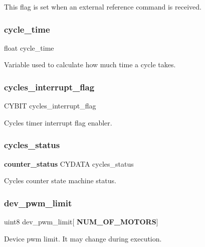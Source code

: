 This flag is set when an external reference command is received. \mbox{\label{globals_8h_a910e6d34a0bb2e8dbaf576e06bdf56f5}} 
\subsubsection{cycle\+\_\+time}
{\footnotesize\ttfamily float cycle\+\_\+time}

Variable used to calculate how much time a cycle takes. \mbox{\label{globals_8h_a9c58c534e60c7991a92a13d012e7ef86}} 
\subsubsection{cycles\+\_\+interrupt\+\_\+flag}
{\footnotesize\ttfamily C\+Y\+B\+IT cycles\+\_\+interrupt\+\_\+flag}

Cycles timer interrupt flag enabler. \mbox{\label{globals_8h_a9087b28d15f17c6475922ba6943b14f3}} 
\subsubsection{cycles\+\_\+status}
{\footnotesize\ttfamily \textbf{ counter\+\_\+status} C\+Y\+D\+A\+TA cycles\+\_\+status}

Cycles counter state machine status. \mbox{\label{globals_8h_ac7fdc35fc8e87ead9b45028d6034fb1b}} 
\subsubsection{dev\+\_\+pwm\+\_\+limit}
{\footnotesize\ttfamily uint8 dev\+\_\+pwm\+\_\+limit[\textbf{ N\+U\+M\+\_\+\+O\+F\+\_\+\+M\+O\+T\+O\+RS}]}

Device pwm limit. It may change during execution. \mbox{\label{globals_8h_a2e254e60f92958e2fdec99dde626dca6}} 
